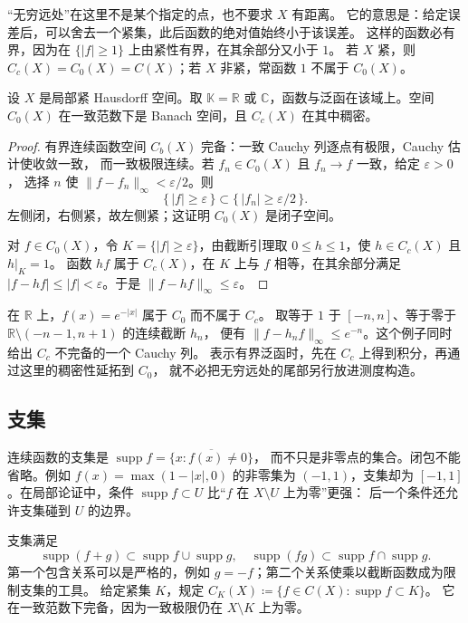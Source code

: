 “无穷远处”在这里不是某个指定的点，也不要求 \(X\) 有距离。
它的意思是：给定误差后，可以舍去一个紧集，此后函数的绝对值始终小于该误差。
这样的函数必有界，因为在 \(\{|f|\geq1\}\) 上由紧性有界，在其余部分又小于 \(1\)。
若 \(X\) 紧，则 \(C_c(X)=C_0(X)=C(X)\)；若 \(X\) 非紧，常函数 \(1\) 不属于 \(C_0(X)\)。

\begin{proposition}\label{b1:prop:cc-dense-c0}
设 \(X\) 是局部紧 Hausdorff 空间。取 \(\mathbb K=\mathbb R\) 或 \(\mathbb C\)，函数与泛函在该域上。空间 \(C_0(X)\) 在一致范数下是 Banach 空间，且 \(C_c(X)\) 在其中稠密。
\end{proposition}
\begin{proof}
有界连续函数空间 \(C_b(X)\) 完备：一致 Cauchy 列逐点有极限，Cauchy 估计使收敛一致，
而一致极限连续。若 \(f_n\in C_0(X)\) 且 \(f_n\to f\) 一致，给定 \(\varepsilon>0\)，
选择 \(n\) 使 \(\|f-f_n\|_\infty<\varepsilon/2\)。则
\[
 \{\,|f|\geq\varepsilon\,\}
 \subset\{\,|f_n|\geq\varepsilon/2\,\}.
\]
左侧闭，右侧紧，故左侧紧；这证明 \(C_0(X)\) 是闭子空间。

对 \(f\in C_0(X)\)，令 \(K=\{|f|\geq\varepsilon\}\)，由截断引理取
\(0\leq h\leq1\)，使 \(h\in C_c(X)\) 且 \(h|_K=1\)。
函数 \(hf\) 属于 \(C_c(X)\)，在 \(K\) 上与 \(f\) 相等，在其余部分满足
\(|f-hf|\leq|f|<\varepsilon\)。于是 \(\|f-hf\|_\infty\leq\varepsilon\)。
\end{proof}

在 \(\mathbb R\) 上，\(f(x)=e^{-|x|}\) 属于 \(C_0\) 而不属于 \(C_c\)。
取等于 \(1\) 于 \([-n,n]\)、等于零于 \(\mathbb R\setminus(-n-1,n+1)\) 的连续截断 \(h_n\)，
便有 \(\|f-h_nf\|_\infty\leq e^{-n}\)。这个例子同时给出 \(C_c\) 不完备的一个 Cauchy 列。
表示有界泛函时，先在 \(C_c\) 上得到积分，再通过这里的稠密性延拓到 \(C_0\)，
就不必把无穷远处的尾部另行放进测度构造。

\subsection{支集}
\label{b1:subsec:110103}

连续函数的支集是 \(\operatorname{supp}f=\overline{\{x:f(x)\ne0\}}\)，
而不只是非零点的集合。闭包不能省略。例如 \(f(x)=\max(1-|x|,0)\) 的非零集为
\((-1,1)\)，支集却为 \([-1,1]\)。在局部论证中，条件
\(\operatorname{supp}f\subset U\) 比“\(f\) 在 \(X\setminus U\) 上为零”更强：
后一个条件还允许支集碰到 \(U\) 的边界。

\ProseParagraphBreak

支集满足
\[
 \operatorname{supp}(f+g)\subset\operatorname{supp}f\cup\operatorname{supp}g,
 \quad
 \operatorname{supp}(fg)\subset\operatorname{supp}f\cap\operatorname{supp}g.
\]
第一个包含关系可以是严格的，例如 \(g=-f\)；第二个关系使乘以截断函数成为限制支集的工具。
给定紧集 \(K\)，规定 \(C_K(X)\coloneqq\{f\in C(X):\operatorname{supp}f\subset K\}\)。
它在一致范数下完备，因为一致极限仍在 \(X\setminus K\) 上为零。

